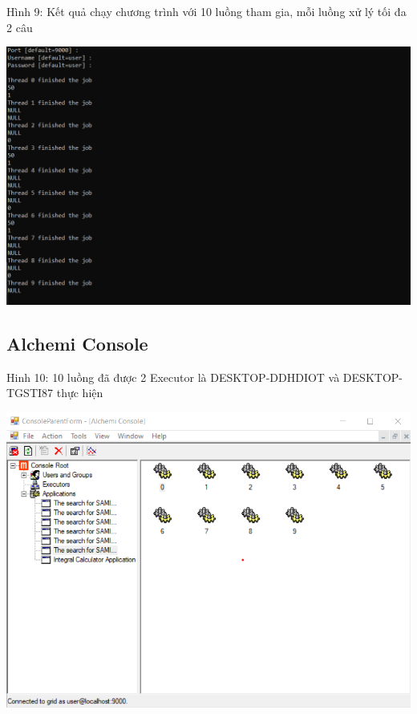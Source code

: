 \documentclass[12pt,a4paper]{article}
\begin{document}
Hình 9: Kết quả chạy chương trình với 10 luồng tham gia, mỗi luồng xử lý tối đa 2 câu
\begin{center}
\includegraphics[scale=0.7]{1.2.png}
\end{center}




\subsection{Alchemi Console} 

Hinh 10: 10 luồng đã được 2 Executor là DESKTOP-DDHDIOT và DESKTOP-TGSTI87 thực hiện
\begin{center}
\includegraphics[scale=0.88]{1..png}
\end{center}
\end{document}

